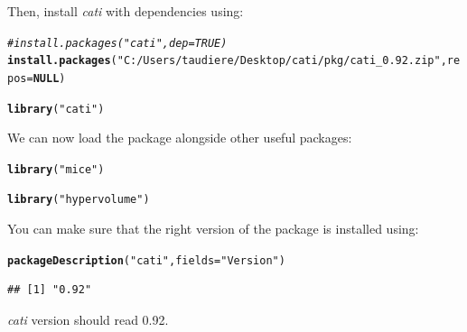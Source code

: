 \documentclass[12pt]{article}\usepackage[]{graphicx}\usepackage[]{color}
\makeatletter
\newcommand{\hlstr}[1]{\textcolor[rgb]{0.192,0.494,0.8}{#1}}%
\newcommand{\hlcom}[1]{\textcolor[rgb]{0.678,0.584,0.686}{\textit{#1}}}%
\newcommand{\hlstd}[1]{\textcolor[rgb]{0.345,0.345,0.345}{#1}}%
\newcommand{\hlkwa}[1]{\textcolor[rgb]{0.161,0.373,0.58}{\textbf{#1}}}%
\newcommand{\hlkwc}[1]{\textcolor[rgb]{0.333,0.667,0.333}{#1}}%
\newcommand{\hlkwd}[1]{\textcolor[rgb]{0.737,0.353,0.396}{\textbf{#1}}}%
\newenvironment{kframe}{%
 \def\at@end@of@kframe{}%
 \ifinner\ifhmode%
  \def\at@end@of@kframe{\end{minipage}}%
  \begin{minipage}{\columnwidth}%
 \fi\fi%
 \def\FrameCommand##1{\hskip\@totalleftmargin \hskip-\fboxsep
 \colorbox{shadecolor}{##1}\hskip-\fboxsep
     \hskip-\linewidth \hskip-\@totalleftmargin \hskip\columnwidth}%
 \MakeFramed {\advance\hsize-\width
   \@totalleftmargin\z@ \linewidth\hsize
   \@setminipage}}%
 {\par\unskip\endMakeFramed%
 \at@end@of@kframe}
\newenvironment{knitrout}{}{} %
\makeatother
\begin{document}
Then, install \textit{cati} with dependencies using:
\begin{knitrout}
\color{fgcolor}\begin{kframe}
\begin{alltt}
\hlcom{#install.packages("cati", dep=TRUE)}
\hlkwd{install.packages}\hlstd{(}\hlstr{"C:/Users/taudiere/Desktop/cati/pkg/cati_0.92.zip"}\hlstd{,} \hlkwc{repos}\hlstd{=}\hlkwa{NULL}\hlstd{)}
\end{alltt}


{\ttfamily\noindent\itshape\color{messagecolor}{\#\# Installing package into 'C:/Users/taudiere/Documents/R/win-library/3.1'\\\#\# (as 'lib' is unspecified)}}\begin{alltt}
\hlkwd{library}\hlstd{(}\hlstr{"cati"}\hlstd{)}
\end{alltt}


{\ttfamily\noindent\itshape\color{messagecolor}{\#\# Loading required package: nlme\\\#\# Loading required package: ade4\\\#\# Loading required package: ape}}\end{kframe}
\end{knitrout}

We can now load the package alongside other useful packages:
\begin{knitrout}
\color{fgcolor}\begin{kframe}
\begin{alltt}
\hlkwd{library}\hlstd{(}\hlstr{"mice"}\hlstd{)}
\end{alltt}


{\ttfamily\noindent\itshape\color{messagecolor}{\#\# Loading required package: Rcpp\\\#\# Loading required package: lattice\\\#\# mice 2.22 2014-06-10}}\begin{alltt}
\hlkwd{library}\hlstd{(}\hlstr{"hypervolume"}\hlstd{)}
\end{alltt}


{\ttfamily\noindent\itshape\color{messagecolor}{\#\# Loading required package: rgl}}\end{kframe}
\end{knitrout}

\noindent You can make sure that the right version of the package is installed using:
\begin{knitrout}
\color{fgcolor}\begin{kframe}
\begin{alltt}
\hlkwd{packageDescription}\hlstd{(}\hlstr{"cati"}\hlstd{,} \hlkwc{fields} \hlstd{=} \hlstr{"Version"}\hlstd{)}
\end{alltt}
\begin{verbatim}
## [1] "0.92"
\end{verbatim}
\end{kframe}
\end{knitrout}
\textit{cati} version should read 0.92.
\end{document}
